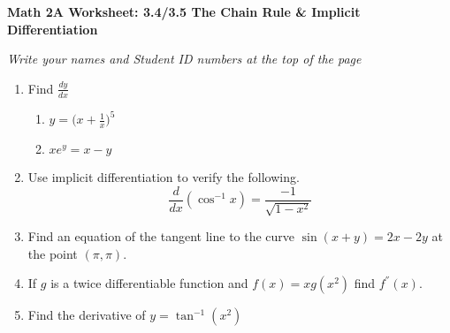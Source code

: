 \documentclass[12pt,fleqn]{article}
\begin{document}
\begin{center}
	\textbf{Math 2A Worksheet: 3.4/3.5 The Chain Rule \& Implicit Differentiation}
\end{center}

\emph{Write your names and Student ID numbers at the top of the page}


\begin{enumerate}
\item Find $\frac{dy}{dx}$
\begin{enumerate}
\item $y=\bigg(x+\frac{1}{x}\bigg)^5$\vfill


\item $xe^y=x-y$\vfill

\end{enumerate}


\vspace{3.5cm}
\item Use implicit differentiation to verify the following.
\[\frac{d}{dx}(\cos^{-1} x)=\frac{-1}{\sqrt{1-x^2}}\]\vfill

\newpage

\item Find an equation of the tangent line to the curve $\sin(x+y)=2x-2y$ at the point $(\pi,\pi)$.\vfill

\item If $g$ is a twice differentiable function and $f(x)=xg(x^2)$ find $f^{''}(x)$.\vfill


\item Find the derivative of $y=\tan^{-1}(x^2)$
\vfill


\end{enumerate}
\end{document}
